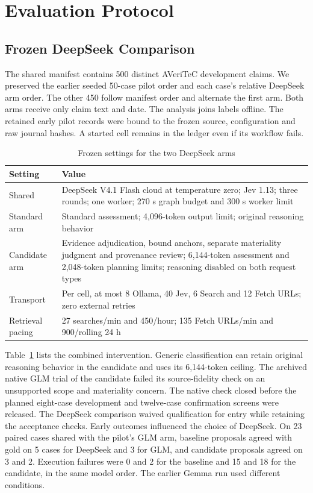 \documentclass[conference]{IEEEtran}
\begin{document}
\section{Evaluation Protocol}
\subsection{Frozen DeepSeek Comparison}
The shared manifest contains 500 distinct AVeriTeC development claims. We preserved the earlier seeded 50-case pilot order and each case's relative DeepSeek arm order. The other 450 follow manifest order and alternate the first arm. Both arms receive only claim text and date. The analysis joins labels offline. The retained early pilot records were bound to the frozen source, configuration and raw journal hashes. A started cell remains in the ledger even if its workflow fails.

\begin{table}[t]
\caption{Frozen settings for the two DeepSeek arms}
\label{tab:deepseek-settings}
\centering
\footnotesize
\begin{tabular}{@{}p{}p{}@{}}
\toprule
Setting & Value\\
\midrule
Shared & DeepSeek V4.1 Flash cloud at temperature zero; Jev 1.13; three rounds; one worker; 270 s graph budget and 300 s worker limit\\
Standard arm & Standard assessment; 4,096-token output limit; original reasoning behavior\\
Candidate arm & Evidence adjudication, bound anchors, separate materiality judgment and provenance review; 6,144-token assessment and 2,048-token planning limits; reasoning disabled on both request types\\
Transport & Per cell, at most 8 Ollama, 40 Jev, 6 Search and 12 Fetch URLs; zero external retries\\
Retrieval pacing & 27 searches/min and 450/hour; 135 Fetch URLs/min and 900/rolling 24 h\\
\bottomrule
\end{tabular}
\end{table}

Table~\ref{tab:deepseek-settings} lists the combined intervention. Generic classification can retain original reasoning behavior in the candidate and uses its 6,144-token ceiling. The archived native GLM trial of the candidate failed its source-fidelity check on an unsupported scope and materiality concern. The native check closed before the planned eight-case development and twelve-case confirmation screens were released. The DeepSeek comparison waived qualification for entry while retaining the acceptance checks. Early outcomes influenced the choice of DeepSeek. On 23 paired cases shared with the pilot's GLM arm, baseline proposals agreed with gold on 5 cases for DeepSeek and 3 for GLM, and candidate proposals agreed on 3 and 2. Execution failures were 0 and 2 for the baseline and 15 and 18 for the candidate, in the same model order. The earlier Gemma run used different conditions.
\end{document}
